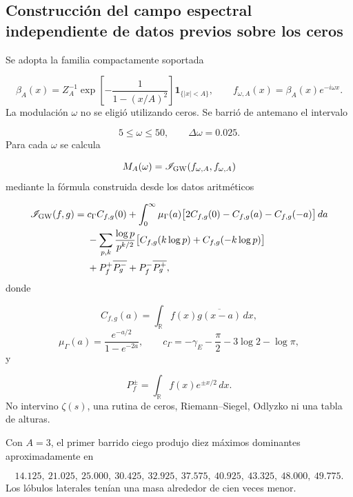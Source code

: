 \subsection{Construcción del campo espectral independiente de datos previos sobre los ceros}
Se adopta la familia compactamente soportada\par
\[
\beta_A(x)=Z_A^{-1}
\exp\!\left[-\frac{1}{1-(x/A)^2}\right]
\mathbf 1_{\{|x|<A\}},
\qquad
f_{\omega,A}(x)=\beta_A(x)e^{-i\omega x}.
\]
La modulación \(\omega\) no se eligió utilizando ceros. Se barrió de antemano el intervalo\par
\[
5\leq\omega\leq50,
\qquad
\Delta\omega=0.025.
\]
Para cada \(\omega\) se calcula\par
\[
M_A(\omega)
=
\mathscr I_{\rm GW}
(f_{\omega,A},f_{\omega,A})
\]
mediante la fórmula construida desde los datos aritméticos\par
\[
\begin{aligned}
\mathscr I_{\rm GW}(f,g)
={}&c_\Gamma C_{f,g}(0)
+\int_0^\infty
\mu_\Gamma(a)
\bigl[
2C_{f,g}(0)-C_{f,g}(a)-C_{f,g}(-a)
\bigr]\,da\\
&-\sum_{p,k}
\frac{\log p}{p^{k/2}}
\bigl[
C_{f,g}(k\log p)+C_{f,g}(-k\log p)
\bigr]\\
&+P_f^+\overline{P_g^-}
+P_f^-\overline{P_g^+},
\end{aligned}
\]
donde\par
\[
C_{f,g}(a)=\int_{\mathbb R}f(x)\overline{g(x-a)}\,dx,
\]
\[
\mu_\Gamma(a)=\frac{e^{-a/2}}{1-e^{-2a}},
\qquad
c_\Gamma=-\gamma_{\!E}-\frac{\pi}{2}-3\log2-\log\pi,
\]
y\par
\[
P_f^\pm=\int_{\mathbb R}f(x)e^{\pm x/2}\,dx.
\]
No intervino \(\zeta(s)\), una rutina de ceros, Riemann–Siegel, Odlyzko ni una tabla de alturas.\par
Con \(A=3\), el primer barrido ciego produjo diez máximos dominantes aproximadamente en\par
\[
14.125,\ 21.025,\ 25.000,\ 30.425,\ 32.925,\ 37.575,\ 40.925,\ 43.325,\ 48.000,\ 49.775.
\]
Los lóbulos laterales tenían una masa alrededor de cien veces menor.\par
{}
